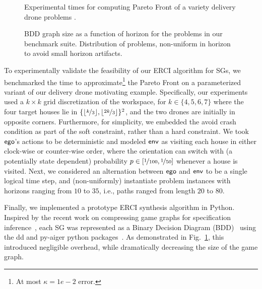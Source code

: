 \begin{figure*}
    \begin{subfigure}{0.5\textwidth}
  \centering
  \scalebox{0.58}{
    
    }
    \caption{
      Experimental times for computing Pareto Front of a variety
      delivery drone problems
      \label{fig:exp_times}.
    }
  \end{subfigure}
  \hfill
    \begin{subfigure}{0.5\textwidth}
    \centering \scalebox{0.6}{
      
    }
    \caption{
      BDD graph size as a function of horizon for the problems in our
      benchmark suite. Distribution of problems, non-uniform in horizon
      to avoid small horizon artifacts\label{fig:bdd_sizes}.
    }
  \end{subfigure}
\end{figure*}

To experimentally validate the feasibility of our ERCI algorithm for
SGs, we benchmarked the time to approximate\footnote{At most $\kappa =
1e-2$ error.} the Pareto Front on a parameterized variant of our
delivery drone motivating example. Specifically, our experiments used
a $k\times k$ grid discretization of the workspace, for $k \in
\{4,5,6,7\}$ where the four target houses lie in
$\{\lfloor\nicefrac{k}{3}\rfloor, \lfloor\nicefrac{2k}{3}\rfloor
\}^2$, and the two drones are initially in opposite
corners. Furthermore, for simplicity, we embedded the avoid crash
condition as part of the soft constraint, rather than a hard
constraint\footnotemark. We took~$\mathsf{ego}$'s actions to be deterministic
and modeled $\mathsf{env}$ as visiting each house in either clock-wise or
counter-wise order, where the orientation can switch with
(a potentially state dependent) probability $p \in [\nicefrac{1}{100},
\nicefrac{1}{50}]$ whenever a house is visited. Next, we considered an
alternation between $\mathsf{ego}$ and $\mathsf{env}$ to be a single logical time
step, and (non-uniformly) instantiate problem instances with horizons
ranging from $10$ to $35$, i.e., paths ranged from length $20$ to
$80$.


Finally, we implemented a prototype ERCI synthesis algorithm in Python.
Inspired by the recent work on compressing game graphs for specification
inference~\cite{DBLP:conf/cav/Vazquez-Chanlatte20}, each SG was represented
as a Binary Decision Diagram (BDD)~\cite{DBLP:journals/csur/Bryant92} using the
dd and py-aiger python packages~\cite{dd, pyAiger}. As demonstrated in Fig.~\ref{fig:exp_times},
this introduced negligible overhead, while dramatically decreasing the size
of the game graph.\footnotemark 


